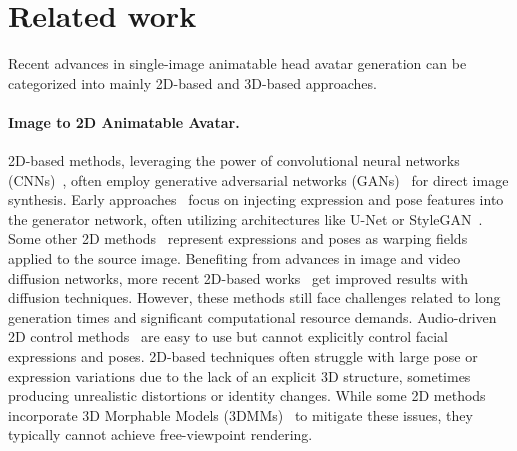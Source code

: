 
\section{Related work}


Recent advances in single-image animatable head avatar generation can be categorized into mainly 2D-based and 3D-based approaches. 

\paragraph{\bf Image to 2D Animatable Avatar.}
2D-based methods, leveraging the power of convolutional neural networks (CNNs)~\cite{DBLP:conf/cvpr/KarrasLAHLA20,DBLP:conf/cvpr/IsolaZZE17,DBLP:conf/nips/GoodfellowPMXWOCB14}, often employ generative adversarial networks (GANs)~\cite{DBLP:conf/cvpr/StyleGAN} for direct image synthesis. Early approaches~\cite{DBLP:conf/cvpr/WangDYSW23,DBLP:conf/cvpr/BurkovPGL20,DBLP:conf/iccv/ZakharovSBL19} focus on injecting expression and pose features into the generator network, often utilizing architectures like U-Net or StyleGAN~\cite{DBLP:conf/cvpr/StyleGAN}.
Some other 2D methods~\cite{DBLP:journals/corr/abs-2407-03168,DBLP:conf/cvpr/ZhangQZZW0CW023,DBLP:conf/cvpr/HongZS022,DBLP:conf/mm/DrobyshevCKILZ22,DBLP:conf/cvpr/BurkovPGL20,DBLP:conf/nips/SiarohinLT0S19} represent expressions and poses as warping fields applied to the source image. 
Benefiting from advances in image and video diffusion networks, more recent 2D-based works~\cite{DBLP:journals/corr/abs-2410-07718,DBLP:journals/corr/abs-2406-08801,DBLP:conf/eccv/TianWZB24} get improved results with diffusion techniques. 
However, these methods still face challenges related to long generation times and significant computational resource demands. Audio-driven 2D control methods~\cite{DBLP:conf/cvpr/ZhangCWZSGSW23,DBLP:journals/corr/abs-2211-12368,DBLP:conf/iccv/GuoCLLBZ21} are easy to use but cannot explicitly control facial expressions and poses. 2D-based techniques often struggle with large pose or expression variations due to the lack of an explicit 3D structure, sometimes producing unrealistic distortions or identity changes. While some 2D methods~\cite{SadTalker,StyleHEAT,Pirenderer,DBLP:conf/cvpr/WangM021,MegaPortraits} incorporate 3D Morphable Models (3DMMs)~\cite{DBLP:conf/fgr/GerigMBELSV18,DBLP:journals/tog/LiBBL017,DBLP:conf/avss/PaysanKARV09,DBLP:conf/siggraph/BlanzV99} to mitigate these issues, they typically cannot achieve free-viewpoint rendering. 

\vspace{-0.1in}

